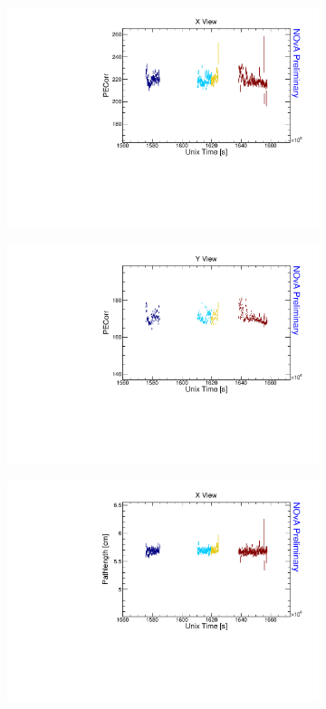 \begin{figure}[!ht]
\begin{subfigure}{0.495\textwidth}
  \end{subfigure}
  \begin{subfigure}{0.495\textwidth}
    \includegraphics[width=\linewidth]{driftsec_tb/pecorr_time_x.pdf}
  \end{subfigure}
  \begin{subfigure}{0.495\textwidth}
    \includegraphics[width=\linewidth]{driftsec_tb/pecorr_time_y.pdf}
  \end{subfigure}
  \begin{subfigure}{0.495\textwidth}
    \includegraphics[width=\linewidth]{driftsec_tb/cm_time_x.pdf}

\end{subfigure}
\end{figure}
